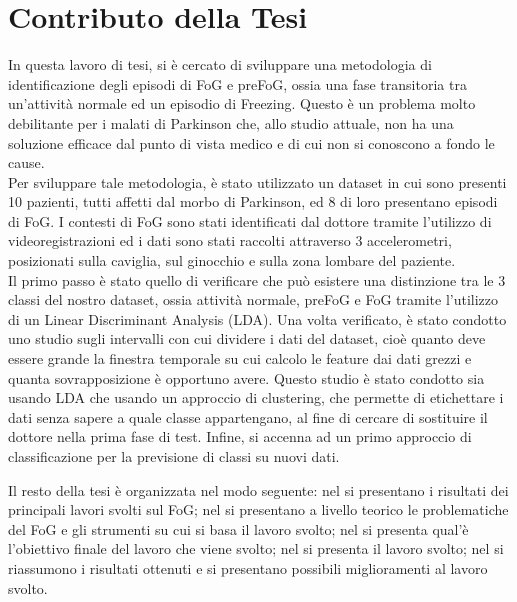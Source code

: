 \section{Contributo della Tesi}\label{cap1:Contributo della Tesi}
In questa lavoro di tesi, si è cercato di sviluppare una metodologia di identificazione degli episodi di FoG e preFoG, ossia una fase transitoria tra un'attività normale ed un episodio di Freezing. Questo è un problema molto debilitante per i malati di Parkinson che, allo studio attuale, non ha una soluzione efficace dal punto di vista medico e di cui non si conoscono a fondo le cause.\\
Per sviluppare tale metodologia, è stato utilizzato un dataset in cui sono presenti 10 pazienti, tutti affetti dal morbo di Parkinson, ed 8 di loro presentano episodi di FoG. I contesti di FoG sono stati identificati dal dottore tramite l'utilizzo di videoregistrazioni ed i dati sono stati raccolti attraverso 3 accelerometri, posizionati sulla caviglia, sul ginocchio e sulla zona lombare del paziente.\\
Il primo passo è stato quello di verificare che può esistere una distinzione tra le 3 classi del nostro dataset, ossia attività normale, preFoG e FoG tramite l'utilizzo di un Linear Discriminant Analysis (LDA). Una volta verificato, è stato condotto uno studio sugli intervalli con cui dividere i dati del dataset, cioè quanto deve essere grande la finestra temporale su cui calcolo le feature dai dati grezzi e quanta sovrapposizione è opportuno avere. Questo studio è stato condotto sia usando LDA che usando un approccio di clustering, che permette di etichettare i dati senza sapere a quale classe appartengano, al fine di cercare di sostituire il dottore nella prima fase di test. Infine, si accenna ad un primo approccio di classificazione per la previsione di classi su nuovi dati.


Il resto della tesi è organizzata nel modo seguente: nel \textbf{} si presentano i risultati dei principali lavori svolti sul FoG; nel \textbf{} si presentano a livello teorico le problematiche del FoG e gli strumenti su cui si basa il lavoro svolto; nel \textbf{} si presenta qual'è l'obiettivo finale del lavoro che viene svolto; nel \textbf{} si presenta il lavoro svolto; nel \textbf{} si riassumono i risultati ottenuti e si presentano possibili miglioramenti al lavoro svolto.
 